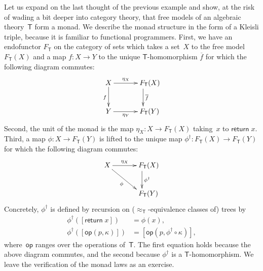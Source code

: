 \documentclass{amsart}
\newcommand{\theory}[1]{\mathsf{#1}} %
\newcommand{\Free}[2]{F_{\theory{#1}}(#2)} %
\newcommand{\FreeFun}[1]{F_{\theory{#1}}} %
\newcommand{\lift}[1]{#1^\dagger} %
\newcommand{\kode}[1]{\mathsf{#1}}
\newcommand{\opcall}[3]{\kode{#1}(#2, #3)}
\newcommand{\return}[1]{\kode{return}\;#1}
\begin{document}
Let us expand on the last thought of the previous example and show, at the risk
of wading a bit deeper into category theory, that free models of an algebraic
theory~$\theory{T}$ form a monad. We describe the monad structure in the form of
a Kleisli triple, because it is familiar to functional programmers. First, we
have an endofunctor $\FreeFun{T}$ on the category of sets which takes a set~$X$
to the free model $\Free{T}{X}$ and a map $f : X \to Y$ to the unique
$\theory{T}$-homomorphism $\overline{f}$ for which the following diagram
commutes:
%
\begin{equation*}
  \xymatrix{
    {X}
    \ar[r]^{\eta_X}
    \ar[d]_{f}
    &
    **[r]{\Free{T}{X}}
    \ar[d]^{\overline{f}}
    \\
    {Y}
    \ar[r]_{\eta_Y}
    &
    **[r]{\Free{T}{Y}}
  }
\end{equation*}
%
Second, the unit of the monad is the map $\eta_X : X \to \Free{T}{X}$ taking~$x$
to $\return{x}$. Third, a map $\phi : X \to \Free{T}{Y}$ is lifted to the unique
map $\lift{\phi} : \Free{T}{X} \to \Free{T}{Y}$ for which the following diagram
commutes:
%
\begin{equation*}
  \xymatrix{
    {X}
    \ar[r]^{\eta_X}
    \ar[rd]_{\phi}
    &
    **[r]{\Free{T}{X}}
    \ar[d]^{\lift{\phi}}
    \\
    &
    **[r]{\Free{T}{Y}}
  }
\end{equation*}
%
Concretely, $\lift{\phi}$ is defined by recursion on
($\approx_{\theory{T}}$-equivalence classes of) trees by
%
\begin{align*}
  \lift{\phi}([\return{x}]) &= \phi(x), \\
  \lift{\phi}([\opcall{op}{p}{\kappa}]) &= [\opcall{op}{p}{\lift{\phi} \circ \kappa}],
\end{align*}
%
where~$\kode{op}$ ranges over the operations of~$\theory{T}$. The first equation
holds because the above diagram commutes, and the second because $\lift{\phi}$ is a
$\theory{T}$-homomorphism. We leave the verification of the monad laws as
an exercise.
\end{document}
